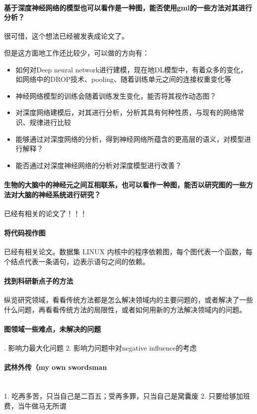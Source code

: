 \paragraph{基于深度神经网络的模型也可以看作是一种图，能否使用gml的一些方法对其进行分析？} 很可惜，这个想法已经被发表成论文了\cite{you2020graph}。

但是这方面地工作还比较少，可以做的方向有：
\begin{itemize}
	\item 如何对Deep neural network进行建模，现在地DL模型中，有着众多的变化，如网络中的DROP技术、pooling、随着训练单元之间的连接权重变化等
	\item {\color{red}神经网络模型的训练会随着训练发生变化，能否将其视作动态图？}
	\item 对深度网络建模后，对其进行分析，分析其具有何种性质，与现有的网络常识、规律进行比较
	\item 能够通过对深度网络的分析，得到神经网络所蕴含的更高层的语义，对模型进行解释？
	\item 能否通过对深度神经网络的分析对深度模型进行改善？
\end{itemize}

\paragraph{生物的大脑中的神经元之间互相联系，也可以看作一种图，能否以研究图的一些方法对大脑的神经系统进行研究？} 已经有相关的论文了！！！
\paragraph{将代码视作图}	已经有相关论文。数据集 LINUX \cite{6228085} 内核中的程序依赖图，每个图代表一个函数，每个结点代表一条语句，边表示语句之间的依赖。
\paragraph{找到科研新点子的方法} 纵览研究领域，看看传统方法都是怎么解决领域内的主要问题的，或者解决了一些什么问题，再看看传统方法的局限性，或者如何用新的方法解决领域内的问题。
\paragraph{图领域一些难点，未解决的问题}. 影响力最大化问题
2. 影响力问题中对negative influence的考虑


\paragraph{武林外传（my own swordsman}\\
1. 吃再多苦，只当自己是二百五；受再多罪，只当自己是窝囊废 
2. 只要给够加班费，当牛做马无所谓


